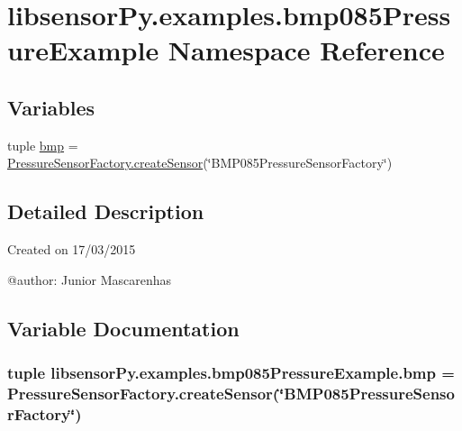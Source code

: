 \hypertarget{namespacelibsensorPy_1_1examples_1_1bmp085PressureExample}{}\section{libsensor\+Py.\+examples.\+bmp085\+Pressure\+Example Namespace Reference}
\label{namespacelibsensorPy_1_1examples_1_1bmp085PressureExample}
\subsection*{Variables}
\begin{DoxyCompactItemize}
\item 
tuple \hyperlink{namespacelibsensorPy_1_1examples_1_1bmp085PressureExample_a67f079fcfb4178e2659ba4a6ce2990a5}{bmp} = \hyperlink{classconcretefactory_1_1pressureSensorFactory_1_1PressureSensorFactory_ace7ec33119f657b5239aae933dbd91bf}{Pressure\+Sensor\+Factory.\+create\+Sensor}(\char`\"{}B\+M\+P085\+Pressure\+Sensor\+Factory\char`\"{})
\end{DoxyCompactItemize}


\subsection{Detailed Description}
\begin{DoxyVerb}Created on 17/03/2015

@author: Junior Mascarenhas
\end{DoxyVerb}
 

\subsection{Variable Documentation}
\hypertarget{namespacelibsensorPy_1_1examples_1_1bmp085PressureExample_a67f079fcfb4178e2659ba4a6ce2990a5}{}
\subsubsection[{bmp}]{\setlength{\rightskip}{0pt plus 5cm}tuple libsensor\+Py.\+examples.\+bmp085\+Pressure\+Example.\+bmp = {\bf Pressure\+Sensor\+Factory.\+create\+Sensor}(\char`\"{}B\+M\+P085\+Pressure\+Sensor\+Factory\char`\"{})}\label{namespacelibsensorPy_1_1examples_1_1bmp085PressureExample_a67f079fcfb4178e2659ba4a6ce2990a5}
